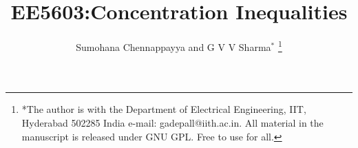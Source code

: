 \documentclass[journal,12pt,twocolumn]{IEEEtran}
\begin{document}
\let\StandardTheFigure\thefigure
\let\vec\mathbf
\renewcommand{\thefigure}{\theproblem}



\def\putbox#1#2#3{\makebox[0in][l]{\makebox[#1][l]{}\raisebox{\baselineskip}[0in][0in]{\raisebox{#2}[0in][0in]{#3}}}}
     \def\rightbox#1{\makebox[0in][r]{#1}}
     \def\centbox#1{\makebox[0in]{#1}}
     \def\topbox#1{\raisebox{-\baselineskip}[0in][0in]{#1}}
     \def\midbox#1{\raisebox{-0.5\baselineskip}[0in][0in]{#1}}

\vspace{3cm}

\title{ 
EE5603:Concentration Inequalities
}


%
%
%

\author{Sumohana Chennappayya and G V V Sharma$^{*}$ %
\thanks{ *The author is with the Department
of Electrical Engineering, IIT, Hyderabad
502285 India e-mail: gadepall@iith.ac.in. All material in the manuscript is released under GNU GPL.  Free to use for all.}%
}
% 
%
\end{document}

